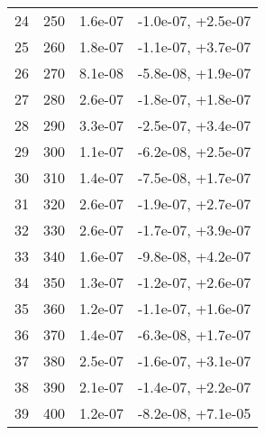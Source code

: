 \begin{table}
\begin{adjustbox}{width=1\textwidth/2}
\begin{tabular}{|c|c|c|c|}
\cline{1-4}
24 & 250 & 1.6e-07 & -1.0e-07, +2.5e-07 \\
\cline{1-4}
25 & 260 & 1.8e-07 & -1.1e-07, +3.7e-07 \\
\cline{1-4}
26 & 270 & 8.1e-08 & -5.8e-08, +1.9e-07 \\
\cline{1-4}
27 & 280 & 2.6e-07 & -1.8e-07, +1.8e-07 \\
\cline{1-4}
28 & 290 & 3.3e-07 & -2.5e-07, +3.4e-07 \\
\cline{1-4}
29 & 300 & 1.1e-07 & -6.2e-08, +2.5e-07 \\
\cline{1-4}
30 & 310 & 1.4e-07 & -7.5e-08, +1.7e-07 \\
\cline{1-4}
31 & 320 & 2.6e-07 & -1.9e-07, +2.7e-07 \\
\cline{1-4}
32 & 330 & 2.6e-07 & -1.7e-07, +3.9e-07 \\
\cline{1-4}
33 & 340 & 1.6e-07 & -9.8e-08, +4.2e-07 \\
\cline{1-4}
34 & 350 & 1.3e-07 & -1.2e-07, +2.6e-07 \\
\cline{1-4}
35 & 360 & 1.2e-07 & -1.1e-07, +1.6e-07 \\
\cline{1-4}
36 & 370 & 1.4e-07 & -6.3e-08, +1.7e-07 \\
\cline{1-4}
37 & 380 & 2.5e-07 & -1.6e-07, +3.1e-07 \\
\cline{1-4}
38 & 390 & 2.1e-07 & -1.4e-07, +2.2e-07 \\
\cline{1-4}
39 & 400 & 1.2e-07 & -8.2e-08, +7.1e-05 \\
\cline{1-4}
\end{tabular}
\end{adjustbox}
\end{table}

